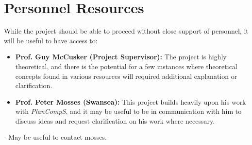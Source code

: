 \documentclass[a4paper,11pt]{report}
\begin{document}

\section{Personnel Resources} %
\label{sec:personnel_resources}
While the project should be able to proceed without close support of personnel, it will be useful to have access to:
\begin{itemize}
    \item \textbf{Prof. Guy McCusker (Project Supervisor):} The project is highly theoretical, and there is the potential for a few instances where theoretical concepts found in various resources will required additional explanation or clarification.
    \item \textbf{Prof. Peter Mosses (Swansea):} This project builds heavily upon his work with \textit{PlanCompS}, and it may be useful to be in communication with him to discuss ideas and request clarification on his work where necessary.
\end{itemize}


- May be useful to contact mosses. 




\end{document}
